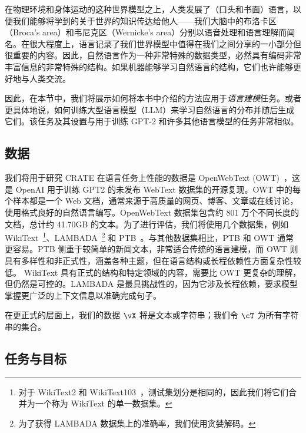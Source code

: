 \documentclass[../../book-main_zh.tex]{subfiles}
\begin{document}
在物理环境和身体运动的这种世界模型之上，人类发展了（口头和书面）语言，以便我们能够将学到的关于世界的知识传达给他人——我们大脑中的布洛卡区（Broca's area）和韦尼克区（Wernicke's area）分别以语音处理和语言理解而闻名。在很大程度上，语言记录了我们世界模型中值得在我们之间分享的一小部分但很重要的内容。因此，自然语言作为一种非常特殊的数据类型，必然具有编码非常丰富信息的非常特殊的结构。如果机器能够学习自然语言的结构，它们也许能够更好地与人类交流。

因此，在本节中，我们将展示如何将本书中介绍的方法应用于\textit{语言建模}任务。或者更具体地说，如何训练大型语言模型（LLM）来学习自然语言的分布并随后生成它们。该任务及其设置与用于训练 GPT-2 和许多其他语言模型的任务非常相似。

\subsection{数据} \label{sub:clm_text_data}

我们将用于研究 CRATE 在语言任务上性能的数据是 OpenWebText (OWT)~\cite{Gokaslan2019OpenWeb}，这是 OpenAI 用于训练 GPT2 的未发布 WebText 数据集的开源复现。OWT 中的每个样本都是一个 Web 文档，通常来源于高质量的网页、博客、文章或在线讨论，使用格式良好的自然语言编写。OpenWebText 数据集包含约 801 万个不同长度的文档，总计约 41.70GB 的文本。为了进行评估，我们将使用几个数据集，例如
WikiText~\cite{merity2016pointer}\footnote{对于 WikiText2 和
WikiText103~\cite{merity2016pointer}，测试集划分是相同的，因此我们将它们合并为一个称为 WikiText 的单一数据集。}、LAMBADA~\cite{paperno2016lambadadatasetwordprediction}\footnote{为了获得 LAMBADA 数据集上的准确率，我们使用贪婪解码。} 和 PTB~\cite{marcus-etal-1993-building}。与其他数据集相比，PTB 和 OWT 通常更容易。PTB 侧重于较简单的新闻文本，非常适合传统的语言建模，而 OWT 则具有多样性和非正式性，涵盖各种主题，但在语言结构或长程依赖性方面复杂性较低。
WikiText 具有正式的结构和特定领域的内容，需要比 OWT 更复杂的理解，但仍然是可控的。LAMBADA 是最具挑战性的，因为它涉及长程依赖，要求模型掌握更广泛的上下文信息以准确完成句子。

在更正式的层面上，我们的数据 \(\vX\) 将是文本或字符串；我们令 \(\cT\) 为所有字符串的集合。

\subsection{任务与目标} \label{sub:clm_text_objective}
\end{document}
